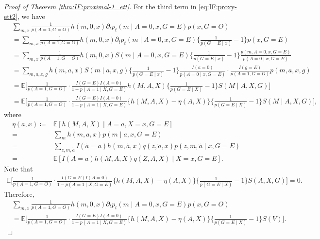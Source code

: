 \documentclass[10pt]{article}
\newcommand{\E}{\mathbb{E}}
\begin{document}
\begin{proof}[Proof of Theorem \ref{thm:IF:proximal-1_ett}]
For the third term in \eqref{eq:IF:proxy-ett2}, we have
{\footnotesize \begin{align*}
&\sum_{m,x} \frac{1}{p(A=1,G=O)}h(m,0,x)\partial_t p_t(m\mid A=0,x,G=E)p(x, G=O)\\
&=\sum_{m,x} \frac{1}{p(A=1,G=O)}h(m,0,x)\partial_t p_t(m\mid A=0,x,G=E)\{\frac{1}{p(G=E\mid x)}-1\}p(x,G=E)\\
&=\sum_{m,x} \frac{1}{p(A=1,G=O)}h(m,0,x)S(m\mid A=0,x,G=E)\{\frac{1}{p(G=E\mid x)}-1\}\frac{p(m,A=0,x,G=E)}{p(A=0\mid x,G=E)}\\
&=\sum_{m,a,x,g} h(m,a,x)S(m\mid a,x,g)\{\frac{1}{p(G=E\mid x)}-1\}\frac{I(a=0)}{p(A=0\mid x,G=E)}\cdot\frac{I(g=E)}{p(A=1,G=O)}p(m,a,x,g)\\
&=\E\Big[\frac{1}{p(A=1,G=O)}\cdot
\frac{I(G=E)I(A=0)}{1-p(A=1\mid X,G=E)}
h(M,A,X)\{\frac{1}{p(G=E\mid X)}-1\}S(M\mid A,X,G)
\Big]\\
&=\E\Big[\frac{1}{p(A=1,G=O)}\cdot
\frac{I(G=E)I(A=0)}{1-p(A=1\mid X,G=E)}\{
h(M,A,X)-\eta(A,X)\}\{\frac{1}{p(G=E\mid X)}-1\}S(M\mid A,X,G)
\Big],
\end{align*}}
where
\begin{align*}
\eta(a,x)\coloneqq&\E[h(M,A,X)\mid A=a,X=x,G=E]\\
=&\sum_m h(m,a,x)p(m\mid a,x,G=E)\\
=&\sum_{z,m,\tilde{a}} I(\tilde{a}=a)h(m,\tilde{a},x)q(z,\tilde{a},x)p(z,m,\tilde{a}\mid x,G=E)\\
=&\E[ I(A=a)h(M,A,X)q(Z,A,X)\mid X=x,G=E ].
\end{align*}
Note that
{\footnotesize
\begin{align*}
\E\Big[\frac{1}{p(A=1,G=O)}\cdot
\frac{I(G=E)I(A=0)}{1-p(A=1\mid X,G=E)}\{
h(M,A,X)-\eta(A,X)\}\{\frac{1}{p(G=E\mid X)}-1\}S(A,X,G)
\Big]=0.
\end{align*}}
Therefore,
{\footnotesize\begin{equation}
\label{eq:IF:proxy-ett3}
\begin{aligned}
&\sum_{m,x} \frac{1}{p(A=1,G=O)}h(m,0,x)\partial_t p_t(m\mid A=0,x,G=E)p(x, G=O)\\
&=\E\Big[\frac{1}{p(A=1,G=O)}\cdot
\frac{I(G=E)I(A=0)}{1-p(A=1\mid X,G=E)}\{
h(M,A,X)-\eta(A,X)\}\{\frac{1}{p(G=E\mid X)}-1\}S(V)
\Big].
\end{aligned}
\end{equation}}


\end{proof}
\end{document}
